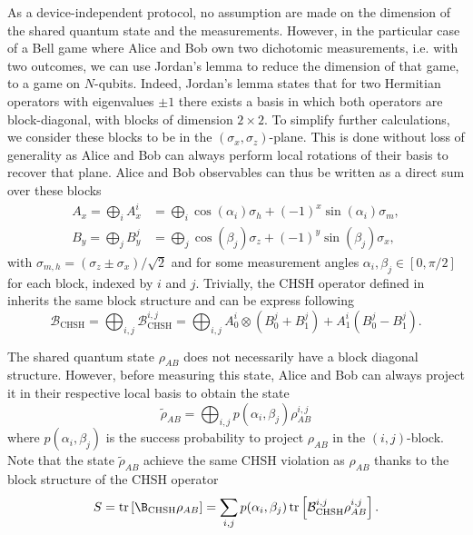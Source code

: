 As a device-independent protocol, no assumption are made on the dimension of the shared quantum state and the measurements.
However, in the particular case of a Bell game where Alice and Bob own two dichotomic measurements, i.e. with two outcomes, we can use Jordan's lemma to reduce the dimension of that game, to a game on $N$-qubits.
Indeed, Jordan's lemma states that for two Hermitian operators with eigenvalues $\pm1$ there exists a basis in which both operators are block-diagonal, with blocks of dimension $2 \times 2$.
To simplify further calculations, we consider these blocks to be in the $(\sigma_x,\sigma_z)$-plane.
This is done without loss of generality as Alice and Bob can always perform local rotations of their basis to recover that plane.
Alice and Bob observables can thus be written as a direct sum over these blocks 
\begin{equation}
	\begin{split}
	A_x = \bigoplus_i A_x^i &= \bigoplus_i \cos(\alpha_i)\sigma_h + (-1)^x \sin(\alpha_i)\sigma_m, \\
	B_y = \bigoplus_j B_y^j &= \bigoplus_j \cos(\beta_j)\sigma_z + (-1)^y \sin(\beta_j)\sigma_x,
	\end{split}
	\label{eq:block_observables}
\end{equation}
with $\sigma_{m,h} = (\sigma_z \pm \sigma_x)/\sqrt{2}$ and for some measurement angles $\alpha_i,\beta_j\in[0,\pi/2]$ for each block, indexed by $i$ and $j$.
Trivially, the CHSH operator defined in  inherits the same block structure and can be express following
\begin{equation}
	\mathcal{B}_\text{CHSH} = \bigoplus_{i,j} \mathcal{B}_\text{CHSH}^{i,j} = \bigoplus_{i,j} A_0^i \otimes (B_0^j + B_1^j) + A_1^i (B_0^j - B_1^j).
	\label{eq:block_operator}
\end{equation}

The shared quantum state $\rho_{AB}$ does not necessarily have a block diagonal structure. 
However, before measuring this state, Alice and Bob can always project it in their respective local basis to obtain the state
\begin{equation}
	\tilde{\rho}_{AB} = \bigoplus_{i,j} p(\alpha_i,\beta_j)\rho_{AB}^{i,j}
	\label{eq:}
\end{equation}
where $p(\alpha_i,\beta_j)$ is the success probability to project $\rho_{AB}$ in the $(i,j)$-block.
Note that the state $\tilde{\rho}_{AB}$ achieve the same CHSH violation as $\rho_{AB}$ thanks to the block structure of the CHSH operator
\begin{equation}
	S = \trr{\B_\text{CHSH}\rho_{AB}} = \sum_{i,j} p(\alpha_i,\beta_j) \trr{\mathcal{B}_\text{CHSH}^{i,j}\rho_{AB}^{i,j}}.
	\label{eq:}
\end{equation}

